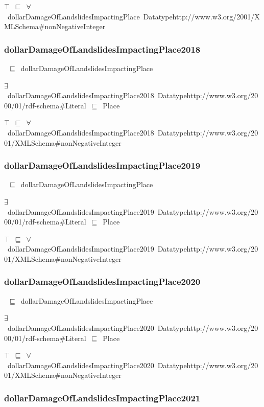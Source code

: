 \documentclass{article}
\begin{document}
\ensuremath{\top}~\ensuremath{\sqsubseteq}~\ensuremath{\forall}~dollarDamageOfLandslidesImpactingPlace~Datatypehttp://www.w3.org/2001/XMLSchema#nonNegativeInteger

\subsubsection*{dollarDamageOfLandslidesImpactingPlace2018}

~\ensuremath{\sqsubseteq}~dollarDamageOfLandslidesImpactingPlace

\ensuremath{\exists}~dollarDamageOfLandslidesImpactingPlace2018~Datatypehttp://www.w3.org/2000/01/rdf-schema#Literal~\ensuremath{\sqsubseteq}~Place

\ensuremath{\top}~\ensuremath{\sqsubseteq}~\ensuremath{\forall}~dollarDamageOfLandslidesImpactingPlace2018~Datatypehttp://www.w3.org/2001/XMLSchema#nonNegativeInteger

\subsubsection*{dollarDamageOfLandslidesImpactingPlace2019}

~\ensuremath{\sqsubseteq}~dollarDamageOfLandslidesImpactingPlace

\ensuremath{\exists}~dollarDamageOfLandslidesImpactingPlace2019~Datatypehttp://www.w3.org/2000/01/rdf-schema#Literal~\ensuremath{\sqsubseteq}~Place

\ensuremath{\top}~\ensuremath{\sqsubseteq}~\ensuremath{\forall}~dollarDamageOfLandslidesImpactingPlace2019~Datatypehttp://www.w3.org/2001/XMLSchema#nonNegativeInteger

\subsubsection*{dollarDamageOfLandslidesImpactingPlace2020}

~\ensuremath{\sqsubseteq}~dollarDamageOfLandslidesImpactingPlace

\ensuremath{\exists}~dollarDamageOfLandslidesImpactingPlace2020~Datatypehttp://www.w3.org/2000/01/rdf-schema#Literal~\ensuremath{\sqsubseteq}~Place

\ensuremath{\top}~\ensuremath{\sqsubseteq}~\ensuremath{\forall}~dollarDamageOfLandslidesImpactingPlace2020~Datatypehttp://www.w3.org/2001/XMLSchema#nonNegativeInteger

\subsubsection*{dollarDamageOfLandslidesImpactingPlace2021}
\end{document}
